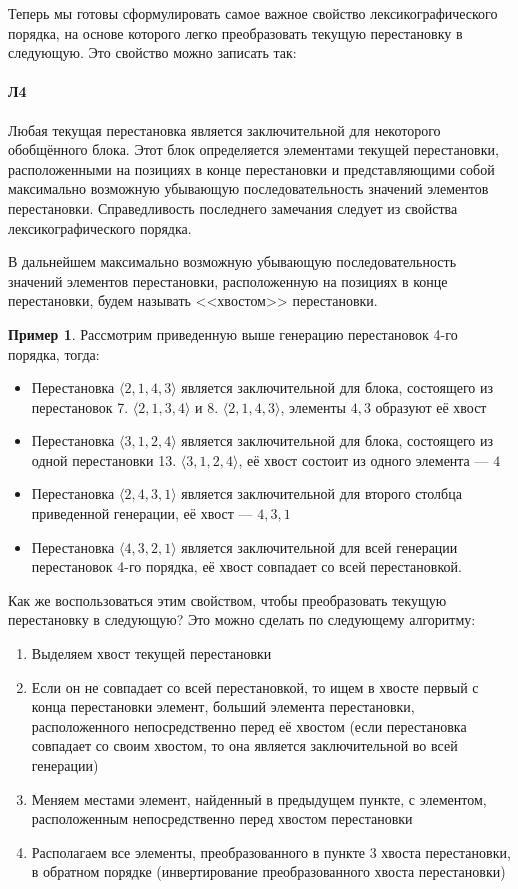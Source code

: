 \documentclass[12pt,a4paper]{article}
\theoremstyle{plain}
\theoremstyle{definition}
\newtheorem*{example}{Пример}
\theoremstyle{remark}
\begin{document}
Теперь мы готовы сформулировать самое важное свойство лексикографического порядка, на основе которого легко преобразовать текущую перестановку в следующую. Это свойство можно записать так:

\paragraph*{Л4}
\label{L4}
Любая текущая перестановка является заключительной для некоторого обобщённого блока. Этот блок определяется элементами текущей перестановки, расположенными на позициях в конце перестановки и представляющими собой максимально возможную убывающую последовательность значений элементов перестановки. Справедливость последнего замечания следует из свойства~ лексикографического порядка.

В дальнейшем максимально возможную убывающую последовательность значений элементов перестановки, расположенную на позициях в конце перестановки, будем называть <<хвостом>> перестановки.

\begin{example}
Рассмотрим приведенную выше генерацию перестановок 4-го порядка, тогда:

\begin{itemize}
\item Перестановка $\langle 2,1,4,3 \rangle$ является заключительной для блока, состоящего из перестановок 7. $\langle 2,1,3,4 \rangle$ и 8. $\langle 2,1,4,3 \rangle$, элементы $4,3$ образуют её хвост
\item Перестановка $\langle 3,1,2,4 \rangle$ является заключительной для блока, состоящего из одной перестановки 13. $\langle 3,1,2,4 \rangle$, её хвост состоит из одного элемента --- $4$
\item Перестановка $\langle 2,4,3,1 \rangle$ является заключительной для второго столбца приведенной генерации, её хвост --- $4,3,1$
\item Перестановка $\langle 4,3,2,1 \rangle$ является заключительной для всей генерации перестановок 4-го порядка, её хвост совпадает со всей перестановкой.
\end{itemize}
\end{example}

Как же воспользоваться этим свойством, чтобы преобразовать текущую перестановку в следующую? Это можно сделать по следующему алгоритму:

\begin{enumerate}
\item Выделяем хвост текущей перестановки
\item Если он не совпадает со всей перестановкой, то ищем в хвосте первый с конца перестановки элемент, больший элемента перестановки, расположенного непосредственно перед её хвостом (если перестановка совпадает со своим хвостом, то она является заключительной во всей генерации)
\item Меняем местами элемент, найденный в предыдущем пункте, с элементом, расположенным непосредственно перед хвостом перестановки
\item Располагаем все элементы, преобразованного в пункте 3 хвоста перестановки, в обратном порядке (инвертирование преобразованного хвоста перестановки)
\end{enumerate}
\end{document}
